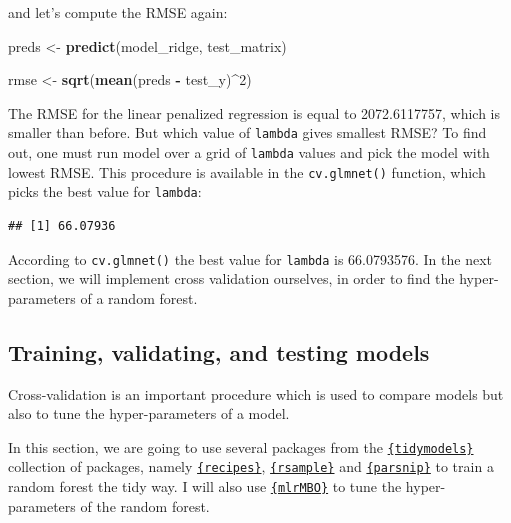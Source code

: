 \documentclass[]{gitbook}
\newenvironment{Shaded}{\begin{snugshade}}{\end{snugshade}}
\newcommand{\CommentTok}[1]{\textcolor[rgb]{0.56,0.35,0.01}{\textit{#1}}}
\newcommand{\DecValTok}[1]{\textcolor[rgb]{0.00,0.00,0.81}{#1}}
\newcommand{\KeywordTok}[1]{\textcolor[rgb]{0.13,0.29,0.53}{\textbf{#1}}}
\newcommand{\NormalTok}[1]{#1}
\newcommand{\OperatorTok}[1]{\textcolor[rgb]{0.81,0.36,0.00}{\textbf{#1}}}
\newcommand{\StringTok}[1]{\textcolor[rgb]{0.31,0.60,0.02}{#1}}
\begin{document}
and let's compute the RMSE again:

\begin{Shaded}
\begin{Highlighting}[]
\NormalTok{preds <-}\StringTok{ }\KeywordTok{predict}\NormalTok{(model_ridge, test_matrix)}

\NormalTok{rmse <-}\StringTok{ }\KeywordTok{sqrt}\NormalTok{(}\KeywordTok{mean}\NormalTok{(preds }\OperatorTok{-}\StringTok{ }\NormalTok{test_y)}\OperatorTok{^}\DecValTok{2}\NormalTok{)}
\end{Highlighting}
\end{Shaded}

The RMSE for the linear penalized regression is equal to 2072.6117757, which is smaller than before.
But which value of \texttt{lambda} gives smallest RMSE? To find out, one must run model over a grid of
\texttt{lambda} values and pick the model with lowest RMSE. This procedure is available in the \texttt{cv.glmnet()}
function, which picks the best value for \texttt{lambda}:

\begin{Shaded}
\end{Shaded}

\begin{verbatim}
## [1] 66.07936
\end{verbatim}

According to \texttt{cv.glmnet()} the best value for \texttt{lambda} is 66.0793576. In the
next section, we will implement cross validation ourselves, in order to find the hyper-parameters
of a random forest.

\hypertarget{training-validating-and-testing-models}{%
\subsection{Training, validating, and testing models}\label{training-validating-and-testing-models}}

Cross-validation is an important procedure which is used to compare models but also to tune the
hyper-parameters of a model.

In this section, we are going to use several packages from the
\href{https://github.com/tidymodels}{\texttt{\{tidymodels\}}} collection of packages, namely
\href{https://tidymodels.github.io/recipes/}{\texttt{\{recipes\}}},
\href{https://tidymodels.github.io/rsample/}{\texttt{\{rsample\}}} and
\href{https://tidymodels.github.io/parsnip/}{\texttt{\{parsnip\}}} to train a random forest the tidy way. I will
also use \href{http://mlrmbo.mlr-org.com/}{\texttt{\{mlrMBO\}}} to tune the hyper-parameters of the random forest.
\end{document}
